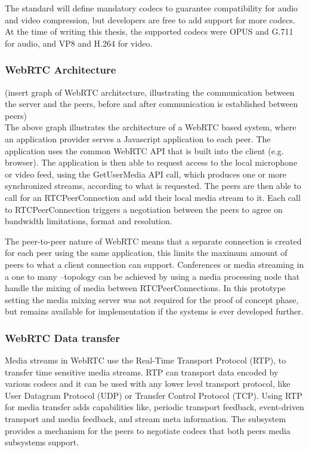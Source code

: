 \documentclass[english,12pt,a4paper,dvips]{article}
\begin{document}
The standard will define mandatory codecs to guarantee compatibility for audio and video compression, but developers are free to add support for more codecs. At the time of writing this thesis, the supported codecs were OPUS and G.711 for audio, and VP8 and H.264 for video. \cite{Jennings}

\subsubsection{WebRTC Architecture}

(insert graph of WebRTC architecture, illustrating the communication between the server and the peers, before and after communication is established between peers)\\

The above graph illustrates the architecture of a WebRTC based system, where an application provider serves a Javascript application to each peer. The application uses the common WebRTC API that is built into the client (e.g. browser). The application is then able to request access to the local microphone or video feed, using the GetUserMedia API call, which produces one or more synchronized streams, according to what is requested. The peers are then able to call for an RTCPeerConnection and add their local media stream to it. Each call to RTCPeerConnection triggers a negotiation between the peers to agree on bandwidth limitations, format and resolution. \cite{Jennings} 

The peer-to-peer nature of WebRTC means that a separate connection is created for each peer using the same application, this limits the maximum amount of peers to what a client connection can support. Conferences or media streaming in a one to many --topology can be achieved by using a media processing node that handle the mixing of media between RTCPeerConnections. \cite{Jennings} In this prototype setting the media mixing server was not required for the proof of concept phase, but remains available for implementation if the systems is ever developed further.

\subsubsection{WebRTC Data transfer}

Media streams in WebRTC use the Real-Time Transport Protocol (RTP), to transfer time sensitive media streams. RTP can transport data encoded by various codecs and it can be used with any lower level transport protocol, like User Datagram Protocol (UDP) or Transfer Control Protocol (TCP). Using RTP for media transfer adds capabilities like, periodic transport feedback, event-driven transport and media feedback, and stream meta information. The subsystem provides a mechanism for the peers to negotiate codecs that both peers media subsystems support. \cite{Jennings}
\end{document}
